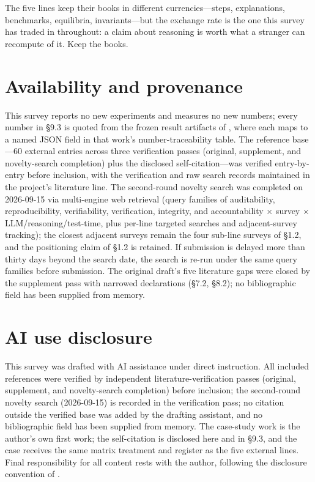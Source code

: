 \documentclass[11pt,a4paper]{article}
\begin{document}
The five lines keep their books in different currencies—steps, explanations, benchmarks, equilibria, invariants—but the exchange rate is the one this survey has traded in throughout: a claim about reasoning is worth what a stranger can recompute of it. Keep the books.

\section*{Availability and provenance}

This survey reports no new experiments and measures no new numbers; every number in §9.3 is quoted from the frozen result artifacts of \cite{key04}, where each maps to a named JSON field in that work's number-traceability table. The reference base—60 external entries across three verification passes (original, supplement, and novelty-search completion) plus the disclosed self-citation—was verified entry-by-entry before inclusion, with the verification and raw search records maintained in the project's literature line. The second-round novelty search was completed on 2026-09-15 via multi-engine web retrieval (query families of auditability, reproducibility, verifiability, verification, integrity, and accountability × survey × LLM/reasoning/test-time, plus per-line targeted searches and adjacent-survey tracking); the closest adjacent surveys remain the four sub-line surveys of §1.2, and the positioning claim of §1.2 is retained. If submission is delayed more than thirty days beyond the search date, the search is re-run under the same query families before submission. The original draft's five literature gaps were closed by the supplement pass with narrowed declarations (§7.2, §8.2); no bibliographic field has been supplied from memory.

\section*{AI use disclosure}

This survey was drafted with AI assistance under direct instruction. All included references were verified by independent literature-verification passes (original, supplement, and novelty-search completion) before inclusion; the second-round novelty search (2026-09-15) is recorded in the verification pass; no citation outside the verified base was added by the drafting assistant, and no bibliographic field has been supplied from memory. The case-study work \cite{key04} is the author's own first work; the self-citation is disclosed here and in §9.3, and the case receives the same matrix treatment and register as the five external lines. Final responsibility for all content rests with the author, following the disclosure convention of \cite{key04}.
\end{document}
